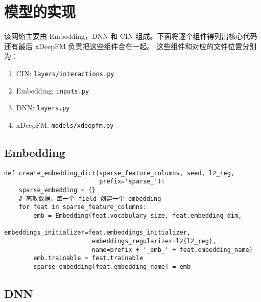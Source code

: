 \documentclass[degree=master,cjk-font=noto]{thuthesis}
\begin{document}
\section{模型的实现}

该网络主要由 Embedding，DNN 和 CIN 组成。下面将逐个组件得列出核心代码
还有最后 xDeepFM 负责把这些组件合在一起。
这些组件和对应的文件位置分别为：

\begin{enumerate}
  \item CIN: \texttt{layers/interactions.py}
  \item Embedding: \texttt{inputs.py}
  \item DNN: \texttt{layers.py}
  \item xDeepFM: \texttt{models/xdeepfm.py}
\end{enumerate}

\subsection{Embedding}

  \begin{verbatim}
def create_embedding_dict(sparse_feature_columns, seed, l2_reg,
                          prefix='sparse_'):
    sparse_embedding = {}
    # 离散数据，每一个 field 创建一个 embedding
    for feat in sparse_feature_columns:
        emb = Embedding(feat.vocabulary_size, feat.embedding_dim,
                        embeddings_initializer=feat.embeddings_initializer,
                        embeddings_regularizer=l2(l2_reg),
                        name=prefix + '_emb_' + feat.embedding_name)
        emb.trainable = feat.trainable
        sparse_embedding[feat.embedding_name] = emb
  \end{verbatim}

\subsection{DNN}
\end{document}
